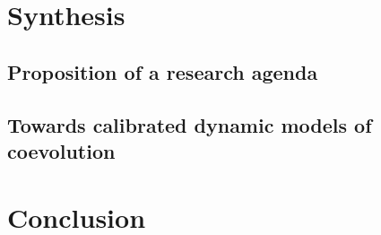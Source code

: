 \section{Synthesis}


\subsection{Proposition of a research agenda}





\subsection{Towards calibrated dynamic models of coevolution}








\section{Conclusion}
















